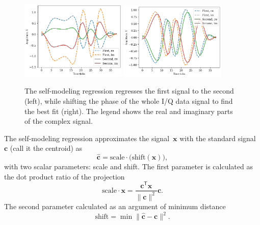 \documentclass[12pt]{article}
\newcommand{\bw}{\mathbf{w}}
\newcommand{\bphi}{\boldsymbol{\varphi}}
\newcommand{\bx}{\mathbf{x}}
\newcommand{\bc}{\mathbf{c}}
\newcommand{\bd}{\mathbf{d}}
\begin{document}
\begin{figure}[!tp]
\centering
\includegraphics[width=0.45\textwidth]{fig_amplitude_scaled_distance}
\includegraphics[width=0.45\textwidth]{fig_centroid_still_in_cluster}
\caption{The self-modeling regression regresses the first signal to the second (left), while shifting the phase of the whole I/Q data signal to find the best fit (right). The legend shows the real and imaginary parts of the complex signal.}
\label{fig:projected_shift}
\end{figure}

The self-modeling regression approximates the signal~$\bx$ with the standard signal~$\bc$ (call it the centroid) as
\[
\hat{\mathbf{c}} = \text{scale} \cdot \bigl( \text{shift}(\mathbf{x})\bigr),
\]  
with two scalar parameters: scale and shift. The first parameter is calculated as the dot product ratio of the projection 
\[
\text{scale}\cdot \mathbf{x} = \frac{\mathbf{c}^\mathsf{T}\mathbf{x}}{\|\mathbf{c}\|^2}\mathbf{c}.
\]
The second parameter calculated as an argument of minimum distance
\[
\text{shift} =\mathop{\min}\|\hat{\mathbf{c}}-\mathbf{c}\|^2.
\]
\end{document}
